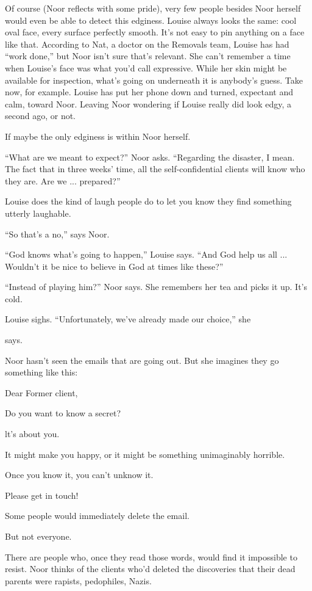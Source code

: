 \documentclass[12pt,a5paper]{book}
\newcommand{\qm}[1]{“#1”}
\begin{document}
Of course (Noor reflects with some pride), very few people besides Noor herself would even be able to detect this edginess. Louise always looks the same: cool oval face, every surface perfectly smooth. It's not easy to pin anything on a face like that. According to Nat, a doctor on the Removals team, Louise has had \qm{work done,} but Noor isn't sure that's relevant. She can't remember a time when Louise's face was what you'd call expressive. While her skin might be available for inspection, what's going on underneath it is anybody's guess. Take now, for example. Louise has put her phone down and turned, expectant and calm, toward Noor. Leaving Noor wondering if Louise really did look edgy, a second ago, or not.

If maybe the only edginess is within Noor herself.

\qm{What are we meant to expect?} Noor asks. \qm{Regarding the disaster, I mean. The fact that in three weeks' time, all the self-confidential clients will know who they are. Are we ... prepared?}

Louise does the kind of laugh people do to let you know they find something utterly laughable.

\qm{So that's a no,} says Noor.

\qm{God knows what's going to happen,} Louise says. \qm{And God help us all ... Wouldn't it be nice to believe in God at times like these?}

\qm{Instead of playing him?} Noor says. She remembers her tea and picks it up. It's cold.

Louise sighs. \qm{Unfortunately, we've already made our choice,} she

says.

Noor hasn't seen the emails that are going out. But she imagines they go something like this:

Dear Former client,

Do you want to know a secret?

lt's about you.

It might make you happy, or it might be something unimaginably horrible.

Once you know it, you can't unknow it.

Please get in touch!

Some people would immediately delete the email.

But not everyone.

There are people who, once they read those words, would find it impossible to resist. Noor thinks of the clients who'd deleted the discoveries that their dead parents were rapists, pedophiles, Nazis.
\end{document}
